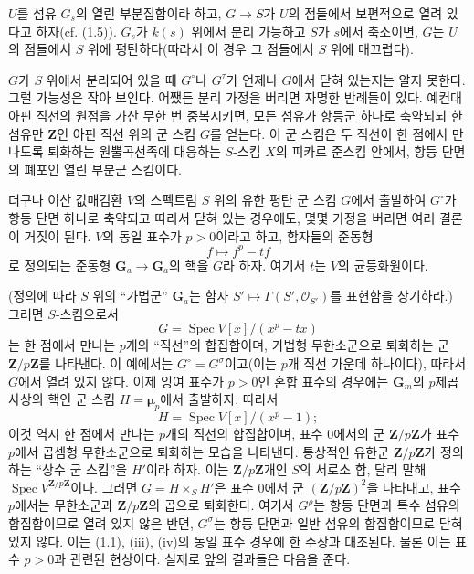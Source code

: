  $U$를 섬유 $G_s$의 열린 부분집합이라 하고,
$G\longrightarrow S$가 $U$의 점들에서 보편적으로 열려 있다고 하자(cf.
(1.5)). $G_s$가 $k(s)$ 위에서 분리 가능하고 $S$가 $s$에서 축소이면,
$G$는 $U$의 점들에서 $S$ 위에 평탄하다(따라서 이 경우 그 점들에서
$S$ 위에 매끄럽다).

 $G$가 $S$ 위에서 분리되어 있을 때 $G^\circ$나
$G^\tau$가 언제나 $G$에서 닫혀 있는지는 알지 못한다. 그럴 가능성은 작아
보인다. 어쨌든 분리 가정을 버리면 자명한 반례들이 있다. 예컨대 아핀 직선의
원점을 가산 무한 번 중복시키면, 모든 섬유가 항등군 하나로 축약되되 한 섬유만
$\mathbf Z$인 아핀 직선 위의 군 스킴 $G$를 얻는다. 이 군 스킴은 두 직선이
한 점에서 만나도록 퇴화하는 원뿔곡선족에 대응하는 $S$-스킴 $X$의 피카르
준스킴 안에서, 항등 단면의 폐포인 열린 부분군 스킴이다.

더구나 이산 값매김환 $V$의 스펙트럼 $S$ 위의 유한 평탄 군 스킴 $G$에서
출발하여 $G^\circ$가 항등 단면 하나로 축약되고 따라서 닫혀 있는 경우에도,
몇몇 가정을 버리면 여러 결론이 거짓이 된다. $V$의 동일 표수가 $p>0$이라고
하고, 함자들의 준동형
\[
f\longmapsto f^p-tf
\]
로 정의되는 준동형 $\mathbf G_a\longrightarrow\mathbf G_a$의 핵을 $G$라
하자. 여기서 $t$는 $V$의 균등화원이다.

(정의에 따라 $S$ 위의 ``가법군'' $\mathbf G_a$는 함자
$S'\longmapsto\Gamma(S',\mathcal O_{S'})$를 표현함을 상기하라.) 그러면
$S$-스킴으로서
\[
G=\operatorname{Spec}V[x]/(x^p-tx)
\]
는 한 점에서 만나는 $p$개의 ``직선''의 합집합이며, 가법형 무한소군으로
퇴화하는 군 $\mathbf Z/p\mathbf Z$를 나타낸다. 이 예에서는
$G^\circ=G^\sigma$이고(이는 $p$개 직선 가운데 하나이다), 따라서
$G$에서 열려 있지 않다. 이제 잉여 표수가 $p>0$인 혼합 표수의 경우에는
$\mathbf G_m$의 $p$제곱 사상의 핵인 군 스킴 $H=\boldsymbol\mu_p$에서
출발하자. 따라서
\[
H=\operatorname{Spec}V[x]/(x^p-1) ;
\]
이것 역시 한 점에서 만나는 $p$개의 직선의 합집합이며, 표수 0에서의 군
$\mathbf Z/p\mathbf Z$가 표수 $p$에서 곱셈형 무한소군으로 퇴화하는 모습을
나타낸다. 통상적인 유한군 $\mathbf Z/p\mathbf Z$가 정의하는 ``상수 군
스킴''을 $H'$이라 하자. 이는 $\mathbf Z/p\mathbf Z$개인 $S$의 서로소 합,
달리 말해 $\operatorname{Spec}V^{\mathbf Z/p\mathbf Z}$이다. 그러면
$G=H\times_S H'$은 표수 0에서 군 $(\mathbf Z/p\mathbf Z)^2$을 나타내고,
표수 $p$에서는 무한소군과 $\mathbf Z/p\mathbf Z$의 곱으로 퇴화한다.
여기서 $G^\rho$는 항등 단면과 특수 섬유의 합집합이므로 열려 있지 않은
반면, $G^\sigma$는 항등 단면과 일반 섬유의 합집합이므로 닫혀 있지 않다.
이는 (1.1), (iii), (iv)의 동일 표수 경우에 한 주장과 대조된다. 물론 이는
표수 $p>0$과 관련된 현상이다. 실제로 앞의 결과들은 다음을 준다.


